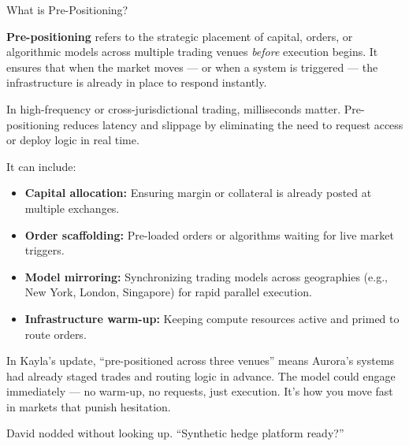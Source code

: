 \begin{TechnicalSidebar}{What is Pre-Positioning?}

  \textbf{Pre-positioning} refers to the strategic placement of capital, orders, or algorithmic models across multiple 
  trading venues \textit{before} execution begins.  
  It ensures that when the market moves — or when a system is triggered — the infrastructure is already in place to 
  respond instantly.

  \medskip

  In high-frequency or cross-jurisdictional trading, milliseconds matter.  
  Pre-positioning reduces latency and slippage by eliminating the need to request access or deploy logic in real time.

  \medskip

  It can include:

  \begin{itemize}
    \item \textbf{Capital allocation:} Ensuring margin or collateral is already posted at multiple exchanges.
    \item \textbf{Order scaffolding:} Pre-loaded orders or algorithms waiting for live market triggers.
    \item \textbf{Model mirroring:} Synchronizing trading models across geographies (e.g., New York, London, Singapore) 
    for rapid parallel execution.
    \item \textbf{Infrastructure warm-up:} Keeping compute resources active and primed to route orders.
  \end{itemize}

  \medskip

  In Kayla’s update, “pre-positioned across three venues” means Aurora’s systems had already staged trades and routing 
  logic in advance.  
  The model could engage immediately — no warm-up, no requests, just execution. It’s how you move fast in markets that 
  punish hesitation.

\end{TechnicalSidebar}

\medskip



David nodded without looking up. “Synthetic hedge platform ready?”

\medskip

